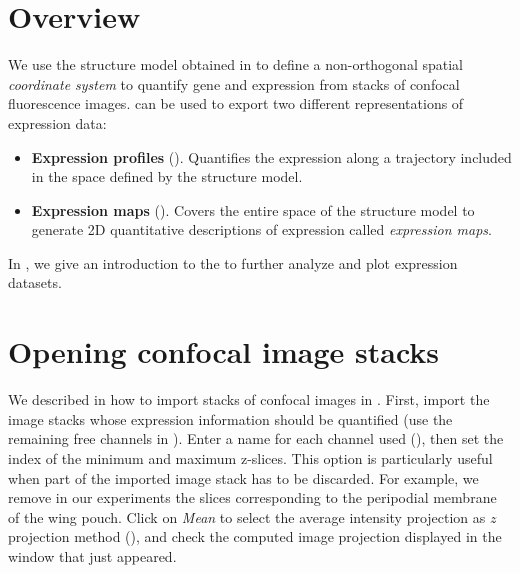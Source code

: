 \section{Overview}
We use the structure model obtained in  to define a non-orthogonal spatial \emph{coordinate system} to quantify gene and expression from stacks of confocal fluorescence images\autocite{schaffter2013}. \wingj can be used to export two different representations of expression data:

\begin{itemize}
 \item \textbf{Expression profiles} (). Quantifies the expression along a trajectory included in the space defined by the structure model.
 \item \textbf{Expression maps} (). Covers the entire space of the structure model to generate 2D quantitative descriptions of expression called \emph{expression maps}.
\end{itemize}

In , we give an introduction to the \wingjMatlab to further analyze and plot expression datasets.


\section{Opening confocal image stacks} \label{sec:expression_image_loading}
We described in  how to import stacks of confocal images in \wingj. First, import the image stacks whose expression information should be quantified (use the remaining free channels in \wingj). Enter a name for each channel used (), then set the index of the minimum and maximum z-slices. This option is particularly useful when part of the imported image stack has to be discarded. For example, we remove in our experiments the slices corresponding to the peripodial membrane of the \droso wing pouch. Click on \textit{Mean} to select the average intensity projection as $z$ projection method (), and check the computed image projection displayed in the window that just appeared.\\

